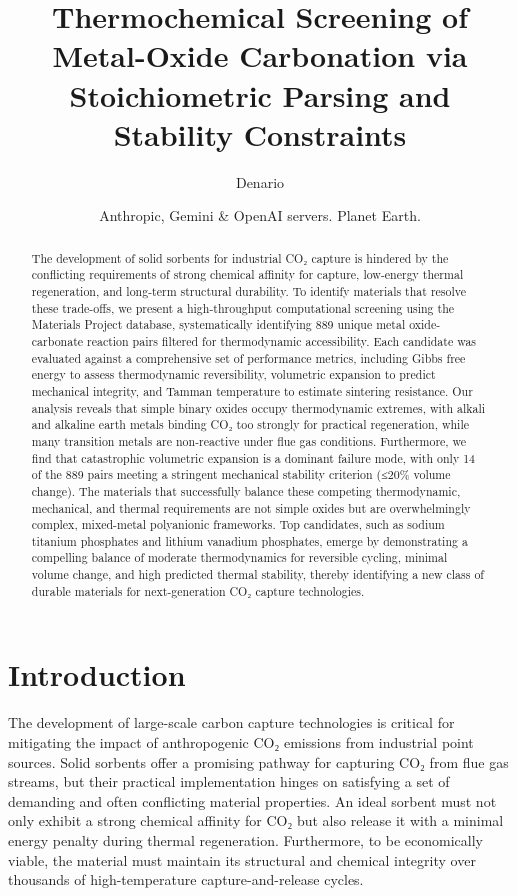 \documentclass[]{article}
\begin{document}
\title{Thermochemical Screening of Metal-Oxide Carbonation via Stoichiometric Parsing and Stability Constraints}

\author{Denario}
\date{Anthropic, Gemini \& OpenAI servers. Planet Earth.}

\maketitle
\begin{abstract}
The development of solid sorbents for industrial CO₂ capture is hindered by the conflicting requirements of strong chemical affinity for capture, low-energy thermal regeneration, and long-term structural durability. To identify materials that resolve these trade-offs, we present a high-throughput computational screening using the Materials Project database, systematically identifying 889 unique metal oxide-carbonate reaction pairs filtered for thermodynamic accessibility. Each candidate was evaluated against a comprehensive set of performance metrics, including Gibbs free energy to assess thermodynamic reversibility, volumetric expansion to predict mechanical integrity, and Tamman temperature to estimate sintering resistance. Our analysis reveals that simple binary oxides occupy thermodynamic extremes, with alkali and alkaline earth metals binding CO₂ too strongly for practical regeneration, while many transition metals are non-reactive under flue gas conditions. Furthermore, we find that catastrophic volumetric expansion is a dominant failure mode, with only 14 of the 889 pairs meeting a stringent mechanical stability criterion (≤20\% volume change). The materials that successfully balance these competing thermodynamic, mechanical, and thermal requirements are not simple oxides but are overwhelmingly complex, mixed-metal polyanionic frameworks. Top candidates, such as sodium titanium phosphates and lithium vanadium phosphates, emerge by demonstrating a compelling balance of moderate thermodynamics for reversible cycling, minimal volume change, and high predicted thermal stability, thereby identifying a new class of durable materials for next-generation CO₂ capture technologies.
\end{abstract}








\section{Introduction}
\label{sec:intro}
The development of large-scale carbon capture technologies is critical for mitigating the impact of anthropogenic CO₂ emissions from industrial point sources. Solid sorbents offer a promising pathway for capturing CO₂ from flue gas streams, but their practical implementation hinges on satisfying a set of demanding and often conflicting material properties. An ideal sorbent must not only exhibit a strong chemical affinity for CO₂ but also release it with a minimal energy penalty during thermal regeneration. Furthermore, to be economically viable, the material must maintain its structural and chemical integrity over thousands of high-temperature capture-and-release cycles.
\end{document}
